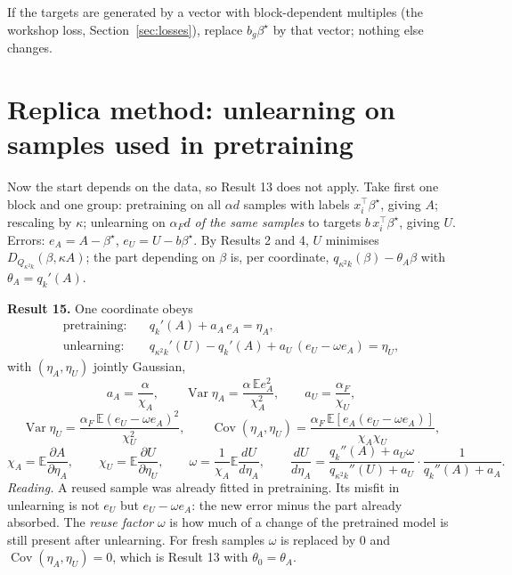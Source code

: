\documentclass[10pt]{article}
\newcommand{\bs}{\beta^\star}\newcommand{\E}{\mathbb E}\newcommand{\asinh}{\operatorname{arcsinh}}\newcommand{\sk}{\sqrt k}
\begin{document}
If the targets are generated by a vector with block-dependent multiples (the workshop loss, Section~\ref{sec:losses}), replace $b_g\bs$ by that vector; nothing else changes.

\section{Replica method: unlearning on samples used in pretraining}\label{rep2}
Now the start depends on the data, so Result 13 does not apply. Take first one block and one group: pretraining on all $\alpha d$ samples with labels $x_i^\top\bs$, giving $A$; rescaling by $\kappa$; unlearning on $\alpha_Fd$ \emph{of the same samples} to targets $b\,x_i^\top\bs$, giving $U$. Errors: $e_A=A-\bs$, $e_U=U-b\bs$. By Results 2 and 4, $U$ minimises $D_{Q_{\kappa^2k}}(\beta,\kappa A)$; the part depending on $\beta$ is, per coordinate, $q_{\kappa^2k}(\beta)-\theta_A\beta$ with $\theta_A=q_k'(A)$.

\textbf{Result 15.} One coordinate obeys
\begin{align}
\text{pretraining:}&\quad q_k'(A)+a_A\,e_A=\eta_A,\label{s1}\\
\text{unlearning:}&\quad q_{\kappa^2k}'(U)-q_k'(A)+a_U\,(e_U-\omega e_A)=\eta_U,\label{s2}
\end{align}
with $(\eta_A,\eta_U)$ jointly Gaussian,
\[
a_A=\frac\alpha{\chi_A},\qquad\operatorname{Var}\eta_A=\frac{\alpha\,\E e_A^2}{\chi_A^2},\qquad a_U=\frac{\alpha_F}{\chi_U},
\]
\[
\operatorname{Var}\eta_U=\frac{\alpha_F\,\E(e_U-\omega e_A)^2}{\chi_U^2},\qquad\operatorname{Cov}(\eta_A,\eta_U)=\frac{\alpha_F\,\E[e_A(e_U-\omega e_A)]}{\chi_A\chi_U},
\]
\[
\chi_A=\E\frac{\partial A}{\partial\eta_A},\qquad\chi_U=\E\frac{\partial U}{\partial\eta_U},\qquad\omega=\frac1{\chi_A}\E\frac{dU}{d\eta_A},\qquad\frac{dU}{d\eta_A}=\frac{q_k''(A)+a_U\omega}{q_{\kappa^2k}''(U)+a_U}\cdot\frac1{q_k''(A)+a_A}.
\]
\emph{Reading.} A reused sample was already fitted in pretraining. Its misfit in unlearning is not $e_U$ but $e_U-\omega e_A$: the new error minus the part already absorbed. The \emph{reuse factor} $\omega$ is how much of a change of the pretrained model is still present after unlearning. For fresh samples $\omega$ is replaced by $0$ and $\operatorname{Cov}(\eta_A,\eta_U)=0$, which is Result 13 with $\theta_0=\theta_A$.
\end{document}
